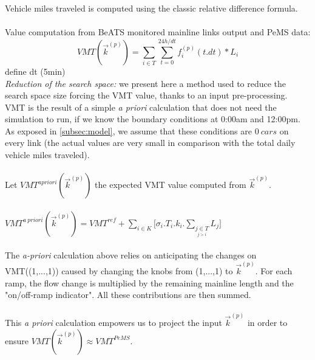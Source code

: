 Vehicle miles traveled is computed using the classic relative difference formula.\\
\\
Value computation from BeATS monitored mainline links output and PeMS data:
\begin{equation*}
	 VMT(\vec{k}^{(p)})=\sum_{i\in{T}}\sum_{t=0}^{24h/dt}f^{(p)}_{i}(t.dt)*L_{i}
\end{equation*}\color{red} define dt (5min) \color{black}\\

\emph{Reduction of the search space:} we present here a method used to reduce the search space size forcing the VMT value, thanks to an input pre-processing.\\
VMT is the result of a simple \emph{a priori} calculation that does not need the simulation to run, if we know the boundary conditions at 0:00am and 12:00pm. As exposed in \ref{subsec:model}, we assume that these conditions are $0\ cars$ on every link (the actual values are very small in comparison with the total daily vehicle miles traveled).\\
\\
Let $VMT^{a priori}(\vec{k}^{(p)})$ the expected VMT value computed from $\vec{k}^{(p)}$.\\
\\
$VMT^{a\ priori}(\vec{k}^{(p)})=VMT^{ref}+\sum \limits_{i\in K}\biggl[\sigma_{i}.T_{i}.k_{i}.\sum\limits_{\underset{j>i}{j\in T}}L_{j}\biggr]$\\
\\	
The \emph{a-priori} calculation above relies on anticipating the changes on VMT((1,...,1)) caused by changing the knobs from (1,...,1) to $\vec{k}^{(p)}$. For each ramp, the flow change is multiplied by the remaining mainline length and the "on/off-ramp indicator". All these contributions are then summed.\\
\\
This \emph{a priori} calculation empowers us to project the input $\vec{k}^{(p)}$ in order to ensure $VMT(\vec{k}^{(p)})\approx VMT^{PeMS}$.\\

